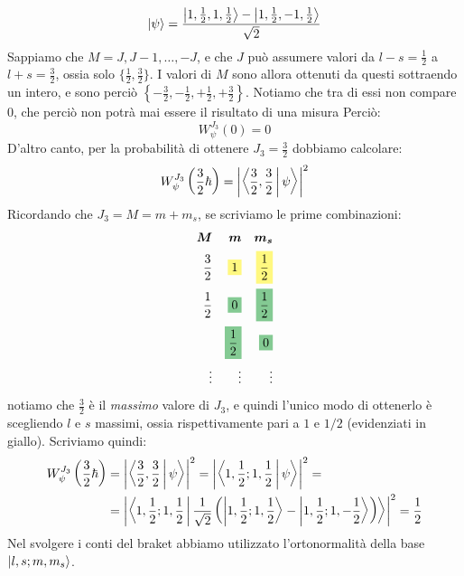 \documentclass[../../FisicaTeorica.tex]{subfiles}
\begin{document}
\begin{enumerate}
\[
\Ket{\psi}=\frac{\Ket{1,\frac{1}{2}, 1, \frac{1}{2}}-\Ket{1,\frac{1}{2}, -1,\frac{1}{2}}}{\sqrt{2}}
\]
Sappiamo che $M=J, J-1, \dots, -J$, e che $J$ può assumere valori da $l-s=\frac{1}{2}$ a $l+s=\frac{3}{2}$, ossia solo $\{\frac{1}{2}, \frac{3}{2}\}$. I valori di $M$ sono allora ottenuti da questi sottraendo un intero, e sono perciò $\left\{-\frac{3}{2},-\frac{1}{2},+\frac{1}{2},+\frac{3}{2} \right\}$. Notiamo che tra di essi non compare $0$, che perciò non potrà mai essere il risultato di una misura Perciò:
\[
W_\psi^{J_3}(0)=0
\]
D'altro canto, per la probabilità di ottenere $J_3=\frac{3}{2}$ dobbiamo calcolare:
\[
W_\psi^{J_3}\left(\frac{3}{2}\hbar\right) = \left|\Braket{\frac{3}{2}, \frac{3}{2}|\psi}\right|^2
\]
Ricordando che $J_3=M=m+m_s$, se scriviamo le prime combinazioni:
\begin{align*}
\bm{M} && \bm{m} && \bm{m_s}\\
\frac{3}{2} && \hlc{Yellow}{1} && \hlc{Yellow}{\frac{1}{2}}\\
\frac{1}{2} && \hlc{ForestGreen}{0} && \hlc{ForestGreen}{\frac{1}{2}}\\
&& \hlc{ForestGreen}{\frac{1}{2}} && \hlc{ForestGreen}{0}\\
\vdots && \vdots && \vdots
\end{align*}
notiamo che $\frac{3}{2}$ è il \textit{massimo} valore di $J_3$, e quindi l'unico modo di ottenerlo è scegliendo $l$ e $s$ massimi, ossia rispettivamente pari a $1$ e $1/2$ (evidenziati in giallo). Scriviamo quindi:
\begin{align*}
W_\psi^{J_3}\left(\frac{3}{2}\hbar\right) &= \left|\Braket{\frac{3}{2}, \frac{3}{2}|\psi}\right|^2 =
\left|\Braket{1,\frac{1}{2};1,\frac{1}{2}|\psi}\right|^2 =\\
&= \left|
\Braket{1,\frac{1}{2};1,\frac{1}{2}|\frac{1}{\sqrt{2}}\left(\Ket{1,\frac{1}{2};1,\frac{1}{2}}-\Ket{1,\frac{1}{2};1,-\frac{1}{2}}\right)}
 \right|^2 = \frac{1}{2}
\end{align*}
Nel svolgere i conti del braket abbiamo utilizzato l'ortonormalità della base $\Ket{l,s;m,m_s}$.


\end{enumerate}
\end{document}
